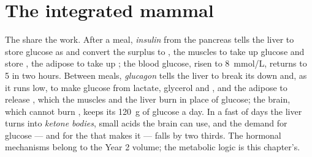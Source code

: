 \section{The integrated mammal}

\begin{proposition}\label{prop:b1:biosyntheses-integration:fedfasting}
The  share the work. After a meal, \emph{insulin} from the
pancreas tells the liver to store glucose as  and convert the
surplus to , the muscles to take up glucose and store , the
adipose  to take up ; the blood glucose, risen to
\qty{8}{mmol/L}, returns to \qty{5}{} in two hours. Between meals,
\emph{glucagon} tells the liver to break its  down and, as it
runs low, to make glucose from lactate, glycerol and , and
the adipose  to release , which the muscles and the
liver burn in place of glucose; the brain, which cannot burn ,
keeps its \qty{120}{g} of glucose a day. In a fast of days the liver
turns  into \emph{ketone bodies}, small acids the brain can
use, and the demand for glucose --- and for the  that makes it
--- falls by two thirds. The hormonal mechanisms belong to the Year 2
volume; the metabolic logic is this chapter's.
\end{proposition}

